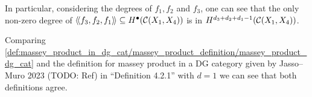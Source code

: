 \begin{remark}
    \label{rem:massey_product_in_dg_cat/massey_product_definition/massey_product_sum_of_degrees}
    In particular, considering the degrees of \( f_1, f_2 \) and \( f_3 \), one can see that the only non-zero degree of \( \langle \! \langle f_3, f_2, f_1 \rangle \! \rangle \subseteq H^\bullet ({\mathcal{C}} (X_1, X_4)) \) is in \( H^{d_3 + d_2 + d_1 - 1} ({\mathcal{C}} (X_1, X_4)) \).
\end{remark}

\begin{remark}
    Comparing \autoref{def:massey_product_in_dg_cat/massey_product_definition/massey_product_dg_cat} and the definition for massey product in a DG category given by Jasso--Muro 2023 (TODO: Ref) in ``Definition 4.2.1'' with \( d = 1 \) we can see that both definitions agree.
\end{remark}

